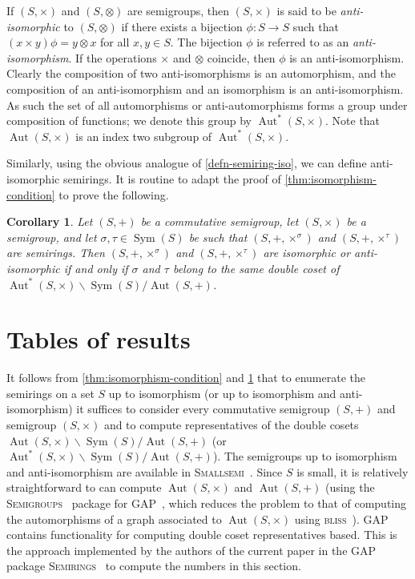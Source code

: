 \documentclass{article}
\theoremstyle{definition}
\theoremstyle{plain}
\newtheorem{cor}[defn]{Corollary}
\newcommand{\GAP}{\textsc{GAP}~\cite{GAP4}\xspace}
\newcommand{\Smallsemi}{\textsc{Smallsemi}~\cite{Smallsemi}\xspace}
\newcommand{\Semigroups}{\textsc{Semigroups}~\cite{Semigroups}\xspace}
\newcommand{\Semirings}{\textsc{Semirings}~\cite{Semirings}\xspace}
\newcommand{\bliss}{\textsc{bliss}~\cite{bliss, junttila2007}\xspace}
\newcommand{\Sym}{\operatorname{Sym}}
\newcommand{\Aut}{\operatorname{Aut}}
\begin{document}
If $(S, \times)$ and $(S, \otimes)$ are semigroups, then $(S, \times)$ is said
to be \textit{anti-isomorphic} to $(S, \otimes)$ if there exists a bijection
$\phi: S \to S$ such that $(x\times y)\phi = y\otimes x$ for all $x, y\in S$.
The bijection $\phi$ is referred to as an \textit{anti-isomorphism}. If the
operations $\times$ and $\otimes$ coincide, then $\phi$ is an anti-isomorphism.
Clearly the composition of two anti-isomorphisms is an automorphism, and the
composition of an anti-isomorphism and an isomorphism is an anti-isomorphism.
As such the set of all automorphisms or anti-automorphisms forms a group under
composition of functions; we denote this group by $\Aut^*(S, \times)$. Note
that $\Aut(S, \times)$ is an index two subgroup of $\Aut^*(S, \times)$.

Similarly, using the obvious analogue of \cref{defn-semiring-iso}, we can
define anti-isomorphic semirings. It is routine to adapt the proof of
\cref{thm:isomorphism-condition} to prove the following.

\begin{cor}
  \label{cor:equiv-condition}
  Let \((S, +)\) be a commutative semigroup, let \((S, \times)\) be a
  semigroup, and let \(\sigma, \tau\in\Sym(S)\) be such that $(S, +, \times ^
  \sigma)$ and $(S, +, \times ^ \tau)$ are semirings. Then \((S, +, \times ^
  \sigma)\) and \((S, +, \times^\tau)\) are isomorphic or anti-isomorphic if
  and only if \(\sigma\) and \(\tau\) belong to the same double coset of
  \(\Aut^*(S, \times) \backslash \Sym(S) / \Aut(S, +)\).
\end{cor}

\section{Tables of results}

It follows from \cref{thm:isomorphism-condition} and \cref{cor:equiv-condition}
that to enumerate the semirings on a set $S$ up to isomorphism (or up to
isomorphism and anti-isomorphism) it suffices to consider every commutative
semigroup $(S, +)$ and semigroup $(S, \times)$ and to compute representatives
of the double cosets \(\Aut(S, \times) \backslash \Sym(S) / \Aut(S, +)\) (or
\(\Aut^*(S, \times) \backslash \Sym(S) / \Aut(S, +)\)). The semigroups up to
isomorphism and anti-isomorphism are available in \Smallsemi.  Since $S$ is
small, it is relatively straightforward to can compute $\Aut(S, \times)$ and
$\Aut(S, +)$ (using the \Semigroups package for \GAP, which reduces
  the problem to that of computing the automorphisms of a graph
associated to $\Aut(S, \times)$ using \bliss). \GAP contains
functionality for computing double coset
representatives based. %
This is the approach implemented by the authors of the current paper in the
\GAP package \Semirings to compute the numbers in this section.
\end{document}
